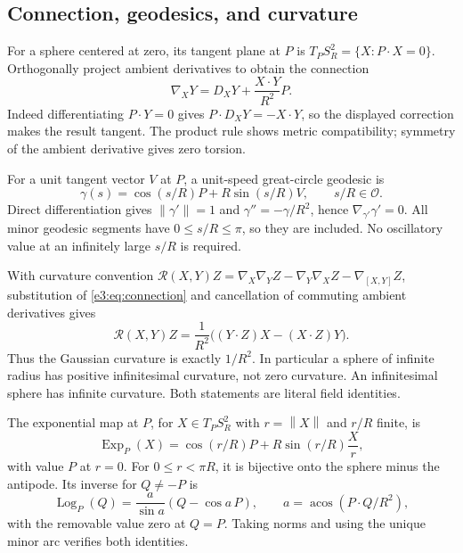 \documentclass[11pt,letterpaper]{article}
\numberwithin{equation}{section}
\theoremstyle{definition}
\theoremstyle{remark}
\newcommand{\OO}{\mathcal O}
\newcommand{\acos}{\operatorname{acos}}
\newcommand{\norm}[1]{\left\lVert#1\right\rVert}
\begin{document}
\subsection{Connection, geodesics, and curvature}

For a sphere centered at zero, its tangent plane at $P$ is
$T_PS_R^2=\{X:P\cdot X=0\}$. Orthogonally project ambient derivatives to
obtain the connection
\begin{equation}\label{e3:eq:connection}
 \nabla_XY=D_XY+\frac{X\cdot Y}{R^2}P.
\end{equation}
Indeed differentiating $P\cdot Y=0$ gives
$P\cdot D_XY=-X\cdot Y$, so the displayed correction makes the result
tangent. The product rule shows metric compatibility; symmetry of the
ambient derivative gives zero torsion.

For a unit tangent vector $V$ at $P$, a unit-speed great-circle geodesic is
\begin{equation}\label{e3:eq:geodesic}
 \gamma(s)=\cos(s/R)P+R\sin(s/R)V,
 \qquad s/R\in\OO.
\end{equation}
Direct differentiation gives $\norm{\gamma'}=1$ and
$\gamma''=-\gamma/R^2$, hence $\nabla_{\gamma'}\gamma'=0$.
All minor geodesic segments have $0\le s/R\le\pi$, so they are included.
No oscillatory value at an infinitely large $s/R$ is required.

With curvature convention
$\mathcal R(X,Y)Z=\nabla_X\nabla_YZ-\nabla_Y\nabla_XZ-\nabla_{[X,Y]}Z$,
substitution of \cref{e3:eq:connection} and cancellation of commuting ambient
derivatives gives
\begin{equation}\label{e3:eq:curvature}
 \mathcal R(X,Y)Z=\frac1{R^2}
       \bigl((Y\cdot Z)X-(X\cdot Z)Y\bigr).
\end{equation}
Thus the Gaussian curvature is exactly $1/R^2$. In particular a sphere of
infinite radius has positive infinitesimal curvature, not zero curvature.
An infinitesimal sphere has infinite curvature. Both statements are literal
field identities.

The exponential map at $P$, for $X\in T_PS_R^2$ with $r=\norm X$ and
$r/R$ finite, is
\[
 \operatorname{Exp}_P(X)=\cos(r/R)P+R\sin(r/R)\frac{X}{r},
\]
with value $P$ at $r=0$. For $0\le r<\pi R$, it is bijective onto the sphere
minus the antipode. Its inverse for $Q\ne-P$ is
\begin{equation}\label{e3:eq:logmap}
 \operatorname{Log}_P(Q)=\frac{a}{\sin a}(Q-\cos a\,P),
 \qquad a=\acos(P\cdot Q/R^2),
\end{equation}
with the removable value zero at $Q=P$. Taking norms and using the unique
minor arc verifies both identities.
\end{document}
